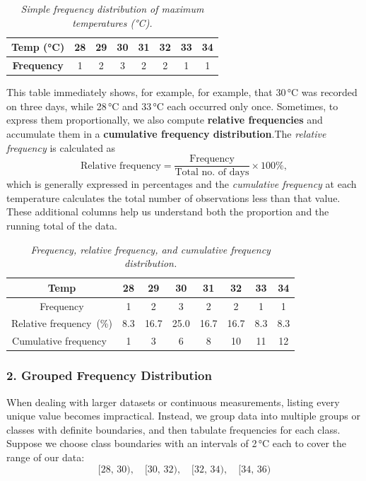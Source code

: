 \documentclass[twoside]{book}
\begin{document}
\begin{table}[H]
\centering
\begin{tabular}{c|ccccccc}
\toprule
\textbf{Temp (°C)} & 28 & 29 & 30 & 31 & 32 & 33 & 34 \\
\midrule
\textbf{Frequency} &  1 &  2 &  3 &  2 &  2 &  1 &  1 \\
\bottomrule
\end{tabular}
\caption{\textit{Simple frequency distribution of maximum temperatures (°C).}}
\end{table}

This table immediately shows, for example, for example, that 30 °C was recorded on three days, while 28 °C and 33 °C each occurred only once. Sometimes, to express them proportionally, we also compute \textbf{relative frequencies} and accumulate them in a \textbf{cumulative frequency distribution}.The \emph{relative frequency} is calculated as
\[
\text{Relative frequency} = \dfrac{\text{Frequency}}{\text{Total no. of days}} \times 100\%,
\]
which is generally expressed in percentages and the \emph{cumulative frequency} at each temperature calculates the total number of observations less than that value. These additional columns help us understand both the proportion and the running total of the data.

\begin{table}[H]
\centering
\begin{tabular}{c|ccccccc}
\toprule
\textbf{Temp} & 28   & 29    & 30    & 31    & 32    & 33    & 34    \\ \midrule
Frequency     & 1    & 2     & 3     & 2     & 2     & 1     & 1     \\
Relative frequency\ (\%) & 8.3 & 16.7 & 25.0 & 16.7 & 16.7 & 8.3  & 8.3  \\
Cumulative frequency\  & 1    & 3     & 6     & 8     & 10    & 11    & 12    \\
\bottomrule
\end{tabular}
\caption{\textit{Frequency, relative frequency, and cumulative frequency distribution.}}
\end{table}


\subsubsection{2. Grouped Frequency Distribution}

When dealing with larger datasets or continuous measurements, listing every unique value becomes impractical. Instead, we group data into multiple groups or {classes} with definite boundaries, and then tabulate frequencies for each class. Suppose we choose class boundaries with an intervals of 2 °C each to cover the range of our data:
\[
[28,\,30),\quad [30,\,32),\quad [32,\,34),\quad [34,\,36)
\]
\end{document}

